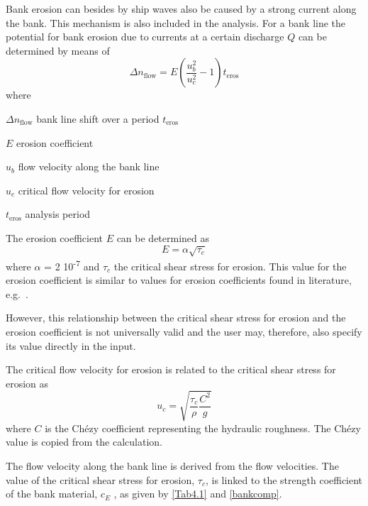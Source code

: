 Bank erosion can besides by ship waves also be caused by a strong current along the bank.
This mechanism is also included in the \dfastbe analysis.
For a bank line the potential for bank erosion due to currents at a certain discharge $Q$ can be determined by means of
%
\begin{equation}
\Delta n_\text{flow} = E \left ( \frac{u_b^2}{u_c^2} - 1 \right ) t_\text{eros}
\end{equation}
%
where
%
\begin{symbollist}
\item[$\Delta n_\text{flow}$] bank line shift over a period $t_\text{eros}$ 
\item[$E$] erosion coefficient 
\item[$u_b$] flow velocity along the bank line 
\item[$u_c$] critical flow velocity for erosion 
\item[$t_\text{eros}$] analysis period 
\end{symbollist}
%
The erosion coefficient $E$ can be determined as
%
\begin{equation}
E = \alpha \sqrt{\tau_c}
\end{equation}
%
where $\alpha$ = 2 10\textsuperscript{-7}  and $\tau_c$  the critical shear stress for erosion.
This value for the erosion coefficient is similar to values for erosion coefficients found in literature, e.g.~\citet{Crosato07}.

However, this relationship between the critical shear stress for erosion and the erosion coefficient is not universally valid and the user may, therefore, also specify its value directly in the input.

The critical flow velocity for erosion is related to the critical shear stress for erosion as
%
\begin{equation}
u_c = \sqrt{\frac{\tau_c}{\rho} \frac{C^2}{g}}
\end{equation}
%
where $C$  is the Ch\'ezy coefficient representing the hydraulic roughness.
The Ch\'ezy value is copied from the \dflowfm calculation.

The flow velocity along the bank line is derived from the \dflowfm flow velocities.
The value of the critical shear stress for erosion, $\tau_c$, is linked to the strength coefficient of the bank material, $c_E$ , as given by \autoref{Tab4.1} and \autoref{bankcomp}.

